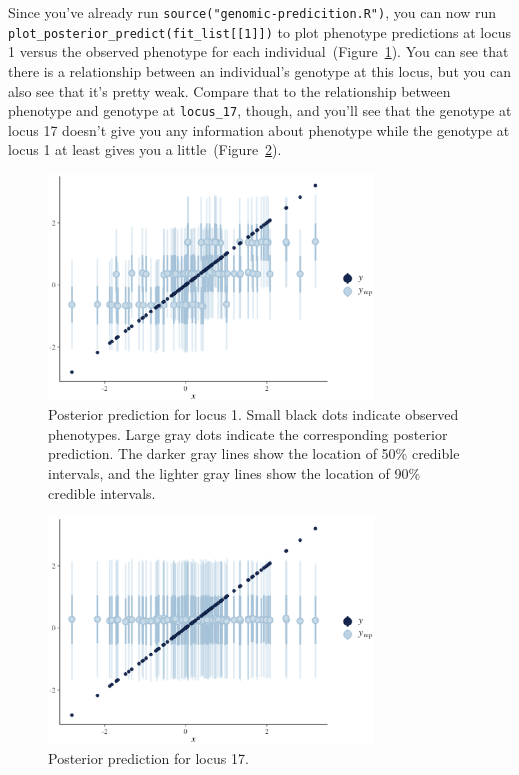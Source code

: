 \documentclass[12pt]{article}
\begin{document}
Since you've already run {\tt source("genomic-predicition.R")}, you
can now run {\tt plot\_posterior\_predict(fit\_list[[1]])} to plot
phenotype predictions at locus 1 versus the observed phenotype for
each individual~(Figure~\ref{fig:locus-1}). You can see that there is
a relationship between an individual's genotype at this locus, but you
can also see that it's pretty weak. Compare that to the relationship
between phenotype and genotype at {\tt locus\_17}, though, and you'll
see that the genotype at locus 17 doesn't give you any information
about phenotype while the genotype at locus 1 at least gives you a
little~(Figure~\ref{fig:locus-17}).

\begin{figure}
  \begin{center}
    \includegraphics[height=6cm]{genomic-prediction-locus-1.eps}
  \end{center}
  \caption{Posterior prediction for locus 1. Small black dots indicate
    observed phenotypes. Large gray dots indicate the corresponding
    posterior prediction. The darker gray lines show the location of
    50\% credible intervals, and the lighter gray lines show the
    location of 90\% credible intervals.}\label{fig:locus-1}
\end{figure}

\begin{figure}
  \begin{center}
    \includegraphics[height=6cm]{genomic-prediction-locus-17.eps}
  \end{center}
  \caption{Posterior prediction for locus 17.}\label{fig:locus-17}
\end{figure}
\end{document}
